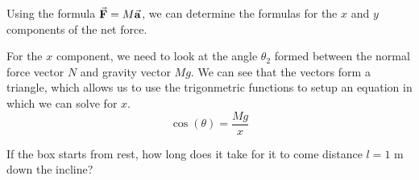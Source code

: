 \documentclass{article}
\begin{document}
\noindent Using the formula $\va{F}=M\va{a}$, we can determine the formulas for the 
$x$ and $y$ components of the net force. 

For the $x$ component, we need to look at the angle $\theta_2$ formed between the 
normal force vector $N$ and gravity vector $Mg$. We can see 
that the vectors form a triangle, which allows us to use the trigonmetric 
functions to setup an equation in which we can solve for $x$.
\[ \cos(\theta) = \frac{Mg}{x}\]

\noindent If the box starts from rest, how long does it take 
for it to come distance $l=1$ m down the incline?

\end{document}
